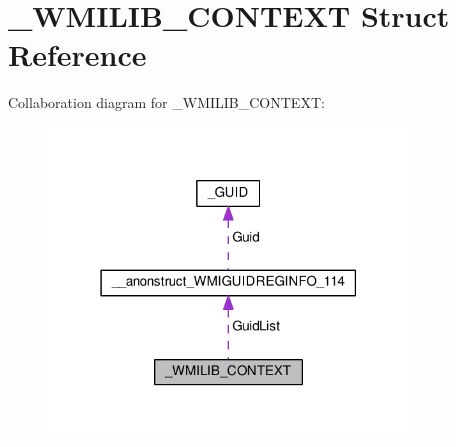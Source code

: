 \hypertarget{struct__WMILIB__CONTEXT}{}\section{\+\_\+\+W\+M\+I\+L\+I\+B\+\_\+\+C\+O\+N\+T\+E\+X\+T Struct Reference}
\label{struct__WMILIB__CONTEXT}


Collaboration diagram for \+\_\+\+W\+M\+I\+L\+I\+B\+\_\+\+C\+O\+N\+T\+E\+X\+T\+:
\nopagebreak
\begin{figure}[H]
\begin{center}
\leavevmode
\includegraphics[width=271pt]{struct__WMILIB__CONTEXT__coll__graph}
\end{center}
\end{figure}
